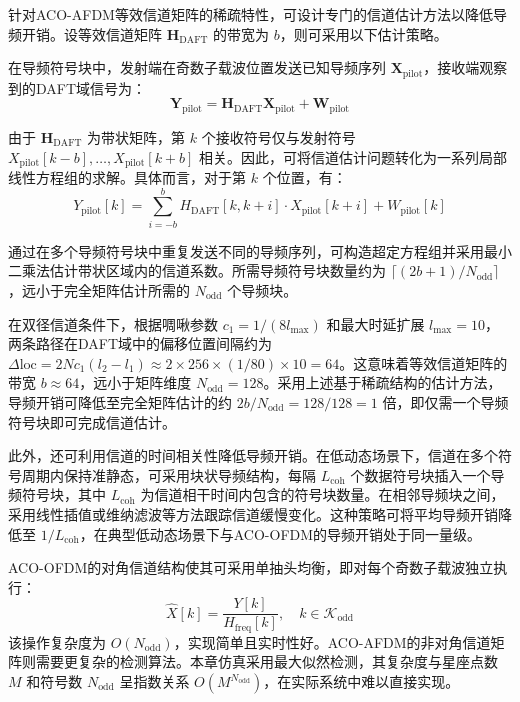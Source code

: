 针对ACO-AFDM等效信道矩阵的稀疏特性，可设计专门的信道估计方法以降低导频开销。设等效信道矩阵 $\mathbf{H}_{\mathrm{DAFT}}$ 的带宽为 $b$，则可采用以下估计策略。

在导频符号块中，发射端在奇数子载波位置发送已知导频序列 $\mathbf{X}_{\mathrm{pilot}}$，接收端观察到的DAFT域信号为：
\begin{equation}
\mathbf{Y}_{\mathrm{pilot}} = \mathbf{H}_{\mathrm{DAFT}} \mathbf{X}_{\mathrm{pilot}} + \mathbf{W}_{\mathrm{pilot}}
\end{equation}

由于 $\mathbf{H}_{\mathrm{DAFT}}$ 为带状矩阵，第 $k$ 个接收符号仅与发射符号 $X_{\mathrm{pilot}}[k-b], \ldots, X_{\mathrm{pilot}}[k+b]$ 相关。因此，可将信道估计问题转化为一系列局部线性方程组的求解。具体而言，对于第 $k$ 个位置，有：
\begin{equation}
Y_{\mathrm{pilot}}[k] = \sum_{i=-b}^{b} H_{\mathrm{DAFT}}[k, k+i] \cdot X_{\mathrm{pilot}}[k+i] + W_{\mathrm{pilot}}[k]
\end{equation}

通过在多个导频符号块中重复发送不同的导频序列，可构造超定方程组并采用最小二乘法估计带状区域内的信道系数。所需导频符号块数量约为 $\lceil (2b+1) / N_{\mathrm{odd}} \rceil$，远小于完全矩阵估计所需的 $N_{\mathrm{odd}}$ 个导频块。

在双径信道条件下，根据啁啾参数 $c_1 = 1/(8l_{\max})$ 和最大时延扩展 $l_{\max}=10$，两条路径在DAFT域中的偏移位置间隔约为 $\Delta \mathrm{loc} = 2Nc_1(l_2-l_1) \approx 2 \times 256 \times (1/80) \times 10 = 64$。这意味着等效信道矩阵的带宽 $b \approx 64$，远小于矩阵维度 $N_{\mathrm{odd}}=128$。采用上述基于稀疏结构的估计方法，导频开销可降低至完全矩阵估计的约 $2b/N_{\mathrm{odd}} = 128/128 = 1$ 倍，即仅需一个导频符号块即可完成信道估计。

此外，还可利用信道的时间相关性降低导频开销。在低动态场景下，信道在多个符号周期内保持准静态，可采用块状导频结构，每隔 $L_{\mathrm{coh}}$ 个数据符号块插入一个导频符号块，其中 $L_{\mathrm{coh}}$ 为信道相干时间内包含的符号块数量。在相邻导频块之间，采用线性插值或维纳滤波等方法跟踪信道缓慢变化。这种策略可将平均导频开销降低至 $1/L_{\mathrm{coh}}$，在典型低动态场景下与ACO-OFDM的导频开销处于同一量级。


ACO-OFDM的对角信道结构使其可采用单抽头均衡，即对每个奇数子载波独立执行：
\begin{equation}
\hat{X}[k] = \frac{Y[k]}{H_{\mathrm{freq}}[k]}, \quad k \in \mathcal{K}_{\mathrm{odd}}
\end{equation}
该操作复杂度为 $O(N_{\mathrm{odd}})$，实现简单且实时性好。ACO-AFDM的非对角信道矩阵则需要更复杂的检测算法。本章仿真采用最大似然检测，其复杂度与星座点数 $M$ 和符号数 $N_{\mathrm{odd}}$ 呈指数关系 $O(M^{N_{\mathrm{odd}}})$，在实际系统中难以直接实现。


